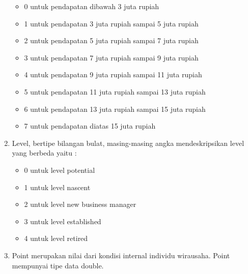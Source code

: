 \begin{enumerate}
\begin{itemize}
			\item 0 untuk pendapatan dibawah 3 juta rupiah
			\item 1 untuk pendapatan 3 juta rupiah sampai 5 juta rupiah
			\item 2 untuk pendapatan 5 juta rupiah sampai 7 juta rupiah
			\item 3 untuk pendapatan 7 juta rupiah sampai 9 juta rupiah
			\item 4 untuk pendapatan 9 juta rupiah sampai 11 juta rupiah
			\item 5 untuk pendapatan 11 juta rupiah sampai 13 juta rupiah
			\item 6 untuk pendapatan 13 juta rupiah sampai 15 juta rupiah
			\item 7 untuk pendapatan diatas 15 juta rupiah
			\end{itemize}
		\item Level, bertipe bilangan bulat, masing-masing angka mendeskripsikan level yang berbeda yaitu :
			\begin{itemize}
			\item 0 untuk level potential
			\item 1 untuk level nascent
			\item 2 untuk level new business manager
			\item 3 untuk level established 
			\item 4 untuk level retired
			\end{itemize}
		\item Point merupakan nilai dari kondisi internal individu wirausaha. Point mempunyai tipe data double.
\end{enumerate}


